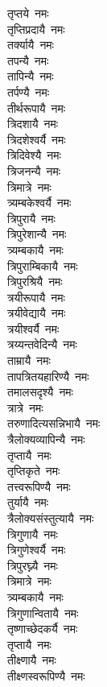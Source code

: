 \begin{flushleft}
\begin{multicols}{2}
तृप्तये~नमः\\
तृप्तिप्रदायै~नमः\\
तर्क्यायै~नमः\\
तपन्यै~नमः\\
तापिन्यै~नमः\\
तर्पण्यै~नमः\\
तीर्थरूपायै~नमः\hfill{}\\
त्रिदशायै~नमः\\
त्रिदशेश्वर्यै~नमः\\
त्रिदिवेश्यै~नमः\\
त्रिजनन्यै~नमः\\
त्रिमात्रे~नमः\\
त्र्यम्बकेश्वर्यै~नमः\\
त्रिपुरायै~नमः\\
त्रिपुरेशान्यै~नमः\\
त्र्यम्बकायै~नमः\\
त्रिपुराम्बिकायै~नमः\hfill{}\\
त्रिपुरश्रियै~नमः\\
त्रयीरूपायै~नमः\\
त्रयीवेद्यायै~नमः\\
त्रयीश्वर्यै~नमः\\
त्रय्यन्तवेदिन्यै~नमः\\
ताम्रायै~नमः\\
तापत्रितयहारिण्यै~नमः\\
तमालसदृश्यै~नमः\\
त्रात्रे~नमः\\
तरुणादित्यसन्निभायै~नमः\hfill{}\\
त्रैलोक्यव्यापिन्यै~नमः\\
तृप्तायै~नमः\\
तृप्तिकृते~नमः\\
तत्त्वरूपिण्यै~नमः\\
तुर्यायै~नमः\\
त्रैलोक्यसंस्तुत्यायै~नमः\\
त्रिगुणायै~नमः\\
त्रिगुणेश्वर्यै~नमः\\
त्रिपुरघ्न्यै~नमः\\
त्रिमात्रे~नमः\hfill{}\\
त्र्यम्बकायै~नमः\\
त्रिगुणान्वितायै~नमः\\
तृष्णाच्छेदकर्यै~नमः\\
तृप्तायै~नमः\\
तीक्ष्णायै~नमः\\
तीक्ष्णस्वरूपिण्यै~नमः\\

\end{multicols}
\end{flushleft}

